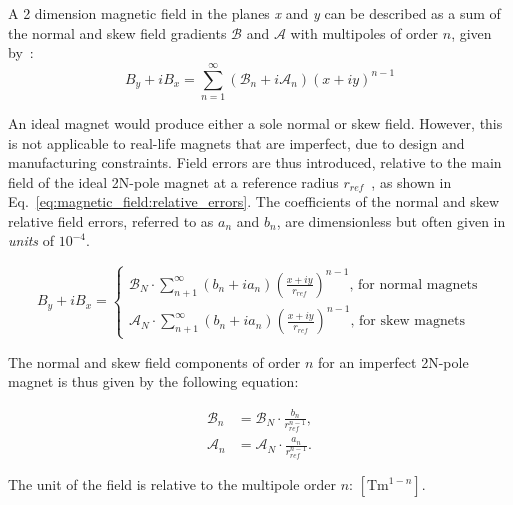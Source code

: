 A 2 dimension magnetic field in the planes \textit{x} and \textit{y} can be described as a sum of
the normal and skew field gradients $\mathcal{B}$ and $\mathcal{A}$ with multipoles of order $n$,
given by~\cite{wolf_engineering_2001}:
\begin{equation}
    B_y + iB_x = \sum_{n=1}^\infty \left(\mathcal{B}_n + i\mathcal{A}_n \right)  (x+iy)^{n-1}
\end{equation}

An ideal magnet would produce either a sole normal or skew field. However, this is not applicable 
to real-life magnets that are imperfect, due to design and manufacturing constraints.
Field errors are thus introduced, relative to the main field of the ideal 2N-pole magnet at a
reference radius $r_{ref}$~\cite{dilly_corrections_2022}, as shown in 
Eq.~\eqref{eq:magnetic_field:relative_errors}. The coefficients of the normal and skew relative 
field errors, referred to as $a_n$ and $b_n$, are dimensionless but often given in \textit{units}
of $10^{-4}$.

\begin{equation}
    B_y + iB_x = 
        \begin{cases}
            \mathcal{B}_N \cdot \sum_{n+1}^\infty (b_n + ia_n) \left(\frac{x+iy}{r_{ref}}\right)^{n-1}\text{, for normal magnets}\\
            \mathcal{A}_N \cdot \sum_{n+1}^\infty (b_n + ia_n) \left(\frac{x+iy}{r_{ref}}\right)^{n-1}\text{, for skew magnets}
        \end{cases}
    \label{eq:magnetic_field:relative_errors}
\end{equation}


The normal and skew field components of order $n$ for an imperfect 2N-pole magnet is thus given by
the following equation:

\begin{equation}
    \begin{aligned}
        \mathcal{B}_n &= \mathcal{B}_N \cdot \frac{b_n}{r_{ref}^{n-1}}, \\
        \mathcal{A}_n &= \mathcal{A}_N \cdot \frac{a_n}{r_{ref}^{n-1}}.
    \end{aligned}
\end{equation}

The unit of the field is relative to the multipole order $n$: $[\text{Tm}^{1-n}]$.


\subsection{}

